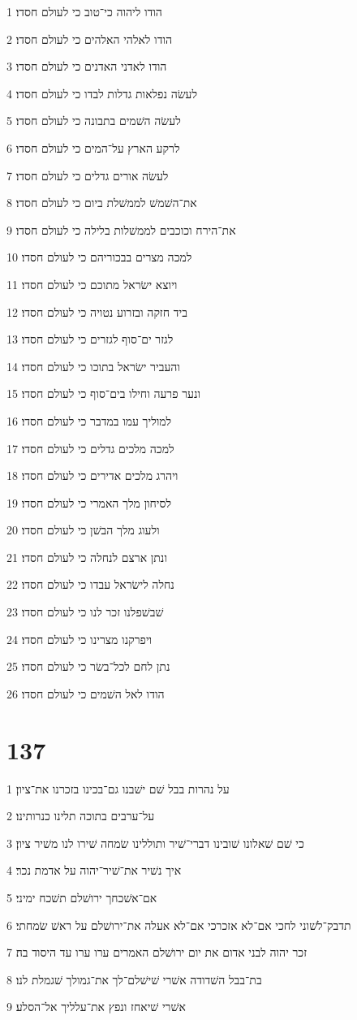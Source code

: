 \par 1 הודו ליהוה כי־טוב כי לעולם חסדו׃
\par 2 הודו לאלהי האלהים כי לעולם חסדו׃
\par 3 הודו לאדני האדנים כי לעולם חסדו׃
\par 4 לעשׂה נפלאות גדלות לבדו כי לעולם חסדו׃
\par 5 לעשׂה השׁמים בתבונה כי לעולם חסדו׃
\par 6 לרקע הארץ על־המים כי לעולם חסדו׃
\par 7 לעשׂה אורים גדלים כי לעולם חסדו׃
\par 8 את־השׁמשׁ לממשׁלת ביום כי לעולם חסדו׃
\par 9 את־הירח וכוכבים לממשׁלות בלילה כי לעולם חסדו׃
\par 10 למכה מצרים בבכוריהם כי לעולם חסדו׃
\par 11 ויוצא ישׂראל מתוכם כי לעולם חסדו׃
\par 12 ביד חזקה ובזרוע נטויה כי לעולם חסדו׃
\par 13 לגזר ים־סוף לגזרים כי לעולם חסדו׃
\par 14 והעביר ישׂראל בתוכו כי לעולם חסדו׃
\par 15 ונער פרעה וחילו בים־סוף כי לעולם חסדו׃
\par 16 למוליך עמו במדבר כי לעולם חסדו׃
\par 17 למכה מלכים גדלים כי לעולם חסדו׃
\par 18 ויהרג מלכים אדירים כי לעולם חסדו׃
\par 19 לסיחון מלך האמרי כי לעולם חסדו׃
\par 20 ולעוג מלך הבשׁן כי לעולם חסדו׃
\par 21 ונתן ארצם לנחלה כי לעולם חסדו׃
\par 22 נחלה לישׂראל עבדו כי לעולם חסדו׃
\par 23 שׁבשׁפלנו זכר לנו כי לעולם חסדו׃
\par 24 ויפרקנו מצרינו כי לעולם חסדו׃
\par 25 נתן לחם לכל־בשׂר כי לעולם חסדו׃
\par 26 הודו לאל השׁמים כי לעולם חסדו׃

\chapter{137}

\par 1 על נהרות בבל שׁם ישׁבנו גם־בכינו בזכרנו את־ציון׃
\par 2 על־ערבים בתוכה תלינו כנרותינו׃
\par 3 כי שׁם שׁאלונו שׁובינו דברי־שׁיר ותוללינו שׂמחה שׁירו לנו משׁיר ציון׃
\par 4 איך נשׁיר את־שׁיר־יהוה על אדמת נכר׃
\par 5 אם־אשׁכחך ירושׁלם תשׁכח ימיני׃
\par 6 תדבק־לשׁוני לחכי אם־לא אזכרכי אם־לא אעלה את־ירושׁלם על ראשׁ שׂמחתי׃
\par 7 זכר יהוה לבני אדום את יום ירושׁלם האמרים ערו ערו עד היסוד בה׃
\par 8 בת־בבל השׁדודה אשׁרי שׁישׁלם־לך את־גמולך שׁגמלת לנו׃
\par 9 אשׁרי שׁיאחז ונפץ את־עלליך אל־הסלע׃

